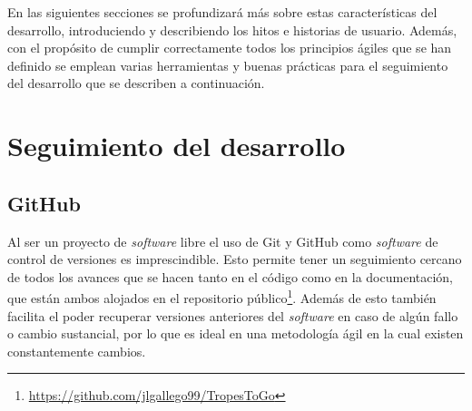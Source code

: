 En las siguientes secciones se profundizará más sobre estas características del
desarrollo, introduciendo y describiendo los hitos e historias de usuario.
Además, con el propósito de cumplir correctamente todos los principios ágiles
que se han definido se emplean varias herramientas y buenas prácticas para el
seguimiento del desarrollo que se describen a continuación.

\section{Seguimiento del desarrollo}
\subsection{GitHub}
Al ser un proyecto de \textit{software} libre el uso de Git y GitHub como \textit{software} de control de versiones es imprescindible. Esto permite tener un seguimiento cercano de todos los avances que se hacen tanto en el código como en la documentación, que están ambos alojados en el repositorio público\footnote{\url{https://github.com/jlgallego99/TropesToGo}}. Además de esto también facilita el poder recuperar versiones anteriores del \textit{software} en caso de algún fallo o cambio sustancial, por lo que es ideal en una metodología ágil en la cual existen constantemente cambios.

